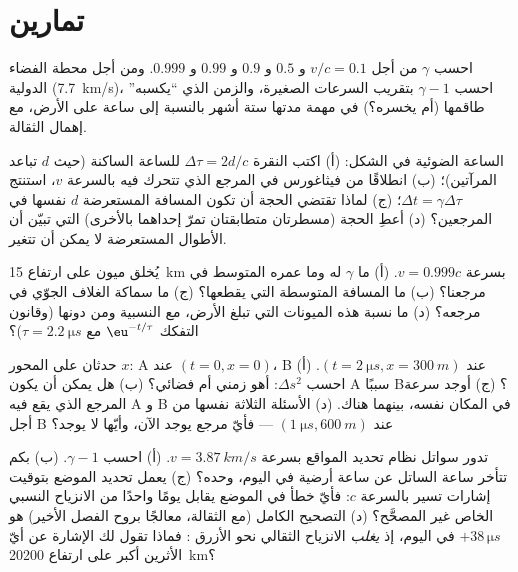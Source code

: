 \section{تمارين}

\begin{exercise}[$\star$]\label{exo:b3:relativistic-kinematics:1}
احسب $\gamma$ من أجل $v/c = 0.1$ و $0.5$ و $0.9$ و $0.99$ و $0.999$.
ومن أجل محطة الفضاء الدولية (\qty{7.7}{km/s})، احسب $\gamma - 1$ بتقريب السرعات الصغيرة، والزمن الذي ``يكسبه'' طاقمها (أم
يخسره؟) في مهمة مدتها ستة أشهر بالنسبة إلى ساعة على الأرض، مع
إهمال الثقالة.
\end{exercise}

\begin{exercise}[$\star$]\label{exo:b3:relativistic-kinematics:2}
الساعة الضوئية في الشكل: (أ) اكتب النقرة $\Delta\tau =
2d/c$ للساعة الساكنة (حيث $d$ تباعد المرآتين)؛ (ب) انطلاقًا
من فيثاغورس في المرجع الذي تتحرك فيه بالسرعة $v$، استنتج $\Delta t =
\gamma\Delta\tau$؛ (ج) لماذا تقتضي الحجة أن تكون المسافة
المستعرضة $d$ نفسها في المرجعين؟ (د) أعطِ الحجة
(مسطرتان متطابقتان تمرّ إحداهما بالأخرى) التي تبيّن أن الأطوال
المستعرضة لا يمكن أن تتغير.
\end{exercise}

\begin{exercise}[$\star$]\label{exo:b3:relativistic-kinematics:3}
يُخلق ميون على ارتفاع \qty{15}{km} بسرعة $v = 0.999c$. (أ) ما
$\gamma$ له وما عمره المتوسط في مرجعنا؟ (ب) ما المسافة المتوسطة
التي يقطعها؟ (ج) ما سماكة الغلاف الجوّي في مرجعه؟ (د) ما نسبة
هذه الميونات التي تبلغ الأرض، مع النسبية ومن دونها (وقانون
التفكك $\eu^{-t/\tau}$ مع $\tau = \qty{2.2}{\micro s}$)؟
\end{exercise}

\begin{exercise}[$\star$]\label{exo:b3:relativistic-kinematics:4}
حدثان على المحور $x$:  A عند $(t = 0, x = 0)$،  B عند $(t =
\qty{2}{\micro s}, x = \qty{300}{m})$. (أ) احسب $\Delta s^2$: أهو
زمني أم فضائي؟ (ب) هل يمكن أن يكون A سببًا  B؟ (ج) أوجد سرعة
المرجع الذي يقع فيه A و B في المكان نفسه، 
بينهما هناك. (د) الأسئلة الثلاثة نفسها من أجل B عند
$(\qty{1}{\micro s}, \qty{600}{m})$ --- فأيّ مرجع يوجد الآن،
وأيّها لا يوجد؟
\end{exercise}

\begin{exercise}[$\star\star$]\label{exo:b3:relativistic-kinematics:5}
تدور سواتل نظام تحديد المواقع بسرعة $v = \qty{3.87}{km/s}$. (أ) احسب $\gamma -
1$. (ب) بكم تتأخر ساعة الساتل عن ساعة أرضية في اليوم،
 وحده؟ (ج) يعمل تحديد الموضع بتوقيت إشارات تسير
بالسرعة $c$: فأيّ خطأ في الموضع يقابل يومًا واحدًا من الانزياح
النسبي الخاص غير المصحَّح؟ (د) التصحيح الكامل (مع الثقالة،
معالجًا بروح الفصل الأخير) هو $+38\,\unit{\micro s}$ في
اليوم، إذ \emph{يغلب} الانزياح الثقالي نحو الأزرق :
فماذا تقول لك الإشارة عن أيّ الأثرين أكبر على ارتفاع
\qty{20200}{km}؟
\end{exercise}

